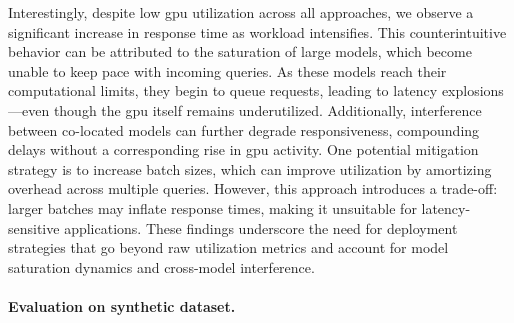 Interestingly, despite low \acrshort{gpu} utilization across all approaches, we observe a significant increase in response time as workload intensifies. This counterintuitive behavior can be attributed to the saturation of large models, which become unable to keep pace with incoming queries. As these models reach their computational limits, they begin to queue requests, leading to latency explosions—even though the \acrshort{gpu} itself remains underutilized. Additionally, interference between co-located models can further degrade responsiveness, compounding delays without a corresponding rise in \acrshort{gpu} activity. One potential mitigation strategy is to increase batch sizes, which can improve utilization by amortizing overhead across multiple queries. However, this approach introduces a trade-off: larger batches may inflate response times, making it unsuitable for latency-sensitive applications. These findings underscore the need for deployment strategies that go beyond raw utilization metrics and account for model saturation dynamics and cross-model interference.


\paragraph{Evaluation on synthetic dataset.}

